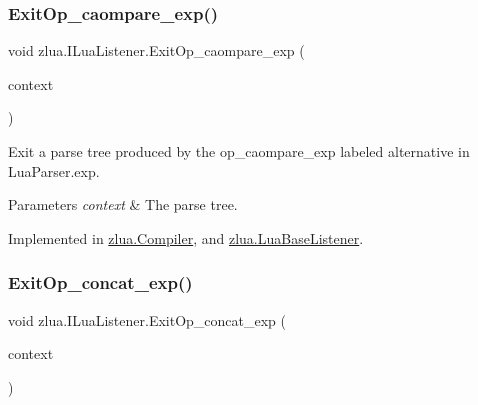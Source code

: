 \subsubsection{\texorpdfstring{Exit\+Op\+\_\+caompare\+\_\+exp()}{ExitOp\_caompare\_exp()}}
{\footnotesize\ttfamily void zlua.\+I\+Lua\+Listener.\+Exit\+Op\+\_\+caompare\+\_\+exp (\begin{DoxyParamCaption}\item[{\mbox{[}\+Not\+Null\mbox{]} \mbox{\hyperlink{classzlua_1_1_lua_parser_1_1_op__caompare__exp_context}{Lua\+Parser.\+Op\+\_\+caompare\+\_\+exp\+Context}}}]{context }\end{DoxyParamCaption})}



Exit a parse tree produced by the {\ttfamily op\+\_\+caompare\+\_\+exp} labeled alternative in Lua\+Parser.\+exp. 


\begin{DoxyParams}{Parameters}
{\em context} & The parse tree.\\
\hline
\end{DoxyParams}


Implemented in \mbox{\hyperlink{classzlua_1_1_compiler_ad8d4d6cd82a6a48264848b8d6f88dae2}{zlua.\+Compiler}}, and \mbox{\hyperlink{classzlua_1_1_lua_base_listener_a0969ff285a2df8e85f1c63245d167077}{zlua.\+Lua\+Base\+Listener}}.

\mbox{\label{interfacezlua_1_1_i_lua_listener_a5d79067d1b0d73aee302cf12972c0d4f}} 
\subsubsection{\texorpdfstring{Exit\+Op\+\_\+concat\+\_\+exp()}{ExitOp\_concat\_exp()}}
{\footnotesize\ttfamily void zlua.\+I\+Lua\+Listener.\+Exit\+Op\+\_\+concat\+\_\+exp (\begin{DoxyParamCaption}\item[{\mbox{[}\+Not\+Null\mbox{]} \mbox{\hyperlink{classzlua_1_1_lua_parser_1_1_op__concat__exp_context}{Lua\+Parser.\+Op\+\_\+concat\+\_\+exp\+Context}}}]{context }\end{DoxyParamCaption})}



